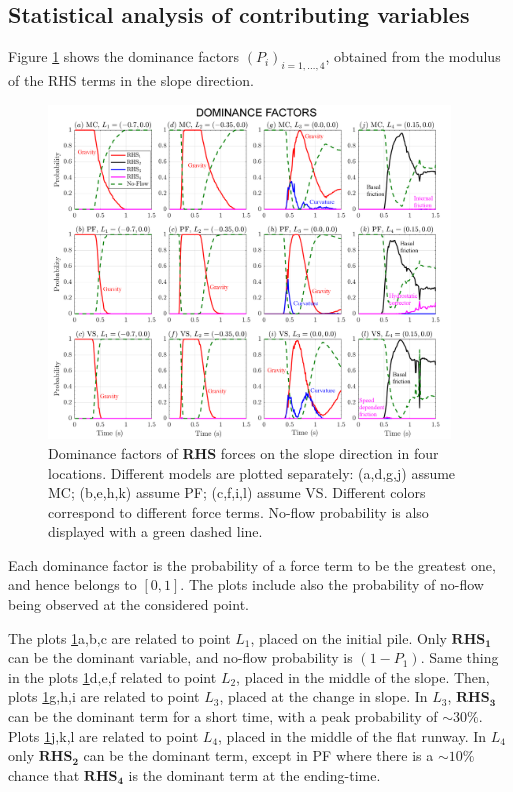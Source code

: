 \documentclass{article}
\begin{document}
\subsection{Statistical analysis of contributing variables}\label{Hq1}
Figure \ref{fig:Ramp-Pr_x} shows the dominance factors $(P_i)_{i=1,\dots,4}$, obtained from the modulus of the RHS terms in the slope direction.
\begin{figure}[H]
         \centering
        \includegraphics[width=0.95\textwidth]{figures/incline/Pr_x.png}
        \caption{Dominance factors of \textbf{RHS} forces on the slope direction in four locations. Different models are plotted separately: (a,d,g,j) assume MC; (b,e,h,k) assume PF; (c,f,i,l) assume VS. Different colors correspond to different force terms. No-flow probability is also displayed with a green dashed line.}
        \label{fig:Ramp-Pr_x}
\end{figure}
Each dominance factor is the probability of a force term to be the greatest one, and hence belongs to $[0,1]$. The plots include also the probability of no-flow being observed at the considered point.

The plots \ref{fig:Ramp-Pr_x}a,b,c are related to point $L_1$, placed on the initial pile. Only $\boldsymbol{RHS_1}$ can be the dominant variable, and no-flow probability is $(1-P_1)$. Same thing in the plots \ref{fig:Ramp-Pr_x}d,e,f related to point $L_2$, placed in the middle of the slope. Then, plots \ref{fig:Ramp-Pr_x}g,h,i are related to point $L_3$, placed at the change in slope. In $L_3$, $\boldsymbol{RHS_3}$ can be the dominant term for a short time, with a peak probability of $\sim 30\%$. Plots \ref{fig:Ramp-Pr_x}j,k,l are related to point $L_4$, placed in the middle of the flat runway. In $L_4$ only $\boldsymbol{RHS_2}$ can be the dominant term, except in PF where there is a $\sim 10\%$ chance that $\boldsymbol{RHS_4}$ is the dominant term at the ending-time.
\end{document}
